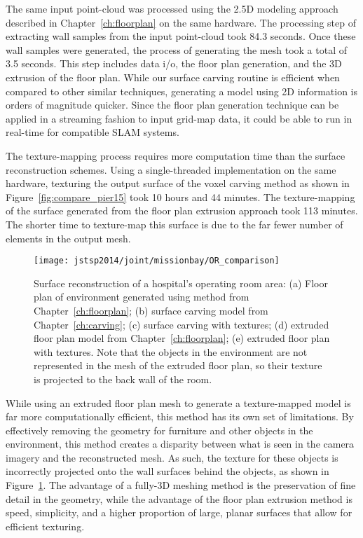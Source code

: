 \documentclass[12pt,onecolumn,oneside]{book}
\begin{document}
The same input point-cloud was processed using the 2.5D modeling approach described in Chapter~\ref{ch:floorplan} on the same hardware.  The processing step of extracting wall samples from the input point-cloud took 84.3 seconds.  Once these wall samples were generated, the process of generating the mesh took a total of 3.5 seconds.  This step includes data i/o, the floor plan generation, and the 3D extrusion of the floor plan.  While our surface carving routine is efficient when compared to other similar techniques, generating a model using 2D information is orders of magnitude quicker.  Since the floor plan generation technique can be applied in a streaming fashion to input grid-map data, it could be able to run in real-time for compatible SLAM systems.

The texture-mapping process requires more computation time than the surface reconstruction schemes.  Using a single-threaded implementation on the same hardware, texturing the output surface of the voxel carving method as shown in Figure~\ref{fig:compare_pier15} took 10 hours and 44 minutes.  The texture-mapping of the surface generated from the floor plan extrusion approach took 113 minutes. The shorter time to texture-map this surface is due to the far fewer number of elements in the output mesh.

\begin{figure}[t]
	\centerline{\texttt{[image: jstsp2014/joint/missionbay/OR\_comparison]}}
	\caption[Comparison of surface reconstruction methods for hospital operating rooms.]{Surface reconstruction of a hospital's operating room area:  (a) Floor plan of environment generated using method from Chapter~\ref{ch:floorplan}; (b) surface carving model from Chapter~\ref{ch:carving}; (c) surface carving with textures; (d) extruded floor plan model from Chapter~\ref{ch:floorplan}; (e) extruded floor plan with textures.  Note that the objects in the environment are not represented in the mesh of the extruded floor plan, so their texture is projected to the back wall of the room.}
	\label{fig:comparison_missionbay}
\end{figure}

While using an extruded floor plan mesh to generate a texture-mapped model is far more computationally efficient, this method has its own set of limitations.  By effectively removing the geometry for furniture and other objects in the environment, this method creates a disparity between what is seen in the camera imagery and the reconstructed mesh.  As such, the texture for these objects is incorrectly projected onto the wall surfaces behind the objects, as shown in Figure~\ref{fig:comparison_missionbay}.  The advantage of a fully-3D meshing method is the preservation of fine detail in the geometry, while the advantage of the floor plan extrusion method is speed, simplicity, and a higher proportion of large, planar surfaces that allow for efficient texturing.
\end{document}
